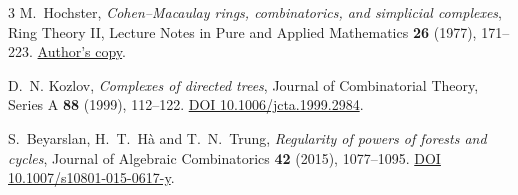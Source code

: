 \documentclass[11pt]{article}
\begin{document}
\begin{thebibliography}{3}
M.~Hochster, \emph{Cohen--Macaulay rings, combinatorics, and simplicial
complexes}, Ring Theory II, Lecture Notes in Pure and Applied Mathematics
\textbf{26} (1977), 171--223.
\href{https://sites.lsa.umich.edu/hochster/wp-content/uploads/sites/1337/2026/03/Cohen-Macaulay-Rings-Combinatorics-and-Simplicial-Complexes.pdf}{Author's copy}.

D.~N. Kozlov, \emph{Complexes of directed trees}, Journal of Combinatorial
Theory, Series A \textbf{88} (1999), 112--122.
\href{https://doi.org/10.1006/jcta.1999.2984}{DOI 10.1006/jcta.1999.2984}.

S.~Beyarslan, H.~T.~H\`a and T.~N.~Trung, \emph{Regularity of powers of
forests and cycles}, Journal of Algebraic Combinatorics \textbf{42}
(2015), 1077--1095.
\href{https://doi.org/10.1007/s10801-015-0617-y}{DOI 10.1007/s10801-015-0617-y}.
\end{thebibliography}
\end{document}
